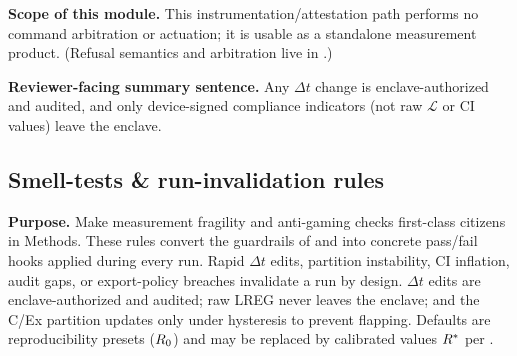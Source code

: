 \documentclass[11pt]{article}
\begin{document}
\textbf{Scope of this module.} This instrumentation/attestation path performs no command arbitration or actuation; it is usable as a standalone measurement product. (Refusal semantics and arbitration live in .)

\textbf{Reviewer-facing summary sentence.} Any $\Delta t$ change is enclave-authorized and audited, and only device-signed compliance indicators (not raw $\mathcal{L}$ or CI values) leave the enclave.

\subsection{Smell-tests \& run-invalidation rules}
\label{sec:smelltests}

\textbf{Purpose.} Make measurement fragility and anti-gaming checks first-class citizens in Methods. These rules convert the guardrails of  and  into concrete pass/fail hooks applied during every run. Rapid $\Delta t$ edits, partition instability, CI inflation, audit gaps, or export-policy breaches invalidate a run by design. $\Delta t$ edits are enclave-authorized and audited; raw LREG never leaves the enclave; and the C/Ex partition updates only under hysteresis to prevent flapping. Defaults are reproducibility presets ($R_0$) and may be replaced by calibrated values $R^*$ per .
\end{document}
